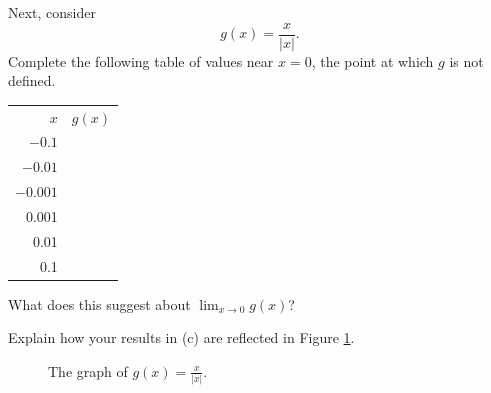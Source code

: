 \begin{pa}
      
\item Next, consider $$g(x) = \frac{x}{|x|}.$$
Complete the following table of values near $x = 0$, the point at which $g$ is not defined.
  \begin{center}
    \begin{tabular}{|r|c|}
      \hline      
      $x$ & $g(x)$ \\
      \hhline{|=|=|}
      $-0.1$ & \hspace*{1in} \\
      \hline
      $-0.01$ & \hspace*{1in} \\
      \hline
      $-0.001$ & \hspace*{1in} \\
      \hline
      0.001 & \hspace*{1in} \\
      \hline
       0.01 & \hspace*{1in} \\
      \hline
      0.1 & \hspace*{1in} \\
      \hline
    \end{tabular}
  \end{center}
  What does this suggest about $\lim_{x\to 0}g(x)$?

\item Explain how your results in (c) are reflected in Figure
  \ref{F:10.1.activity.2}. 

  \begin{figure}[ht]
    \begin{center}
      \caption{The graph of $g(x) = \frac{x}{|x|}$.}
      \label{F:10.1.activity.2}
    \end{center}
  \end{figure}
      

\end{pa}
